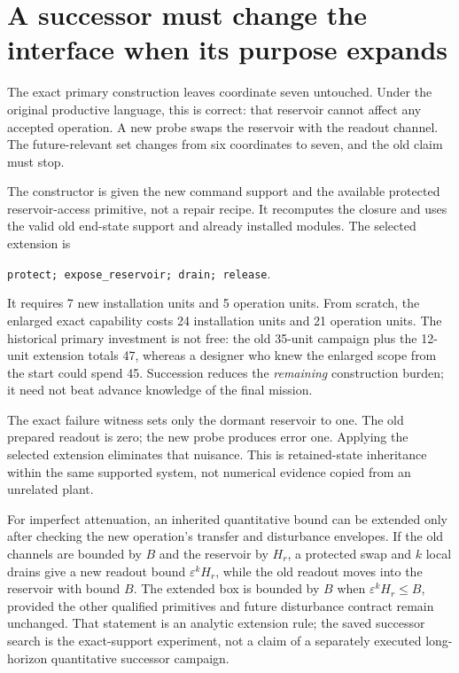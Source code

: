 \documentclass[11pt,letterpaper]{article}
\theoremstyle{definition}\newtheorem{definition}[theorem]{Definition}
\theoremstyle{remark}\newtheorem{remark}[theorem]{Remark}
\begin{document}
\section{A successor must change the interface when its purpose expands}
\label{sec:successor}
The exact primary construction leaves coordinate seven untouched. Under the original productive language, this is correct: that reservoir cannot affect any accepted operation. A new probe swaps the reservoir with the readout channel. The future-relevant set changes from six coordinates to seven, and the old claim must stop.

The constructor is given the new command support and the available protected reservoir-access primitive, not a repair recipe. It recomputes the closure and uses the valid old end-state support and already installed modules. The selected extension is
\begin{center}
\texttt{protect; expose\_reservoir; drain; release}.
\end{center}
It requires 7 new installation units and 5 operation units. From scratch, the enlarged exact capability costs 24 installation units and 21 operation units. The historical primary investment is not free: the old 35-unit campaign plus the 12-unit extension totals 47, whereas a designer who knew the enlarged scope from the start could spend 45. Succession reduces the \emph{remaining} construction burden; it need not beat advance knowledge of the final mission.

The exact failure witness sets only the dormant reservoir to one. The old prepared readout is zero; the new probe produces error one. Applying the selected extension eliminates that nuisance. This is retained-state inheritance within the same supported system, not numerical evidence copied from an unrelated plant.

For imperfect attenuation, an inherited quantitative bound can be extended only after checking the new operation's transfer and disturbance envelopes. If the old channels are bounded by $B$ and the reservoir by $H_r$, a protected swap and $k$ local drains give a new readout bound $\varepsilon^k H_r$, while the old readout moves into the reservoir with bound $B$. The extended box is bounded by $B$ when $\varepsilon^kH_r\leq B$, provided the other qualified primitives and future disturbance contract remain unchanged. That statement is an analytic extension rule; the saved successor search is the exact-support experiment, not a claim of a separately executed long-horizon quantitative successor campaign.
\end{document}
